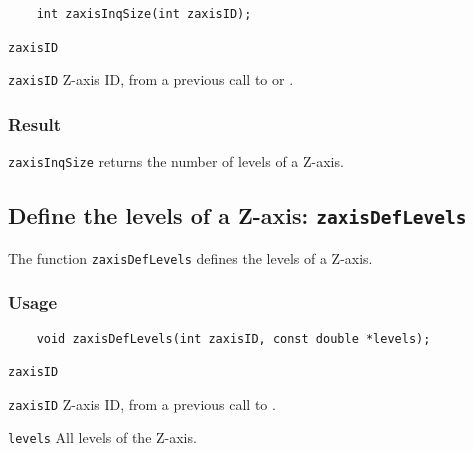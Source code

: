 \begin{verbatim}
    int zaxisInqSize(int zaxisID);
\end{verbatim}

\hspace*{4mm}\begin{minipage}[]{15cm}
\begin{deflist}{\texttt{zaxisID}\ }
\item[\texttt{zaxisID}]
Z-axis ID, from a previous call to {} or {}.

\end{deflist}
\end{minipage}

\subsubsection*{Result}

{\texttt{zaxisInqSize}} returns the number of levels of a Z-axis.



\subsection{Define the levels of a Z-axis: \texttt{zaxisDefLevels}}
\label{zaxisDefLevels}

The function {\texttt{zaxisDefLevels}} defines the levels of a Z-axis.

\subsubsection*{Usage}

\begin{verbatim}
    void zaxisDefLevels(int zaxisID, const double *levels);
\end{verbatim}

\hspace*{4mm}\begin{minipage}[]{15cm}
\begin{deflist}{\texttt{zaxisID}\ }
\item[\texttt{zaxisID}]
Z-axis ID, from a previous call to {}.
\item[\texttt{levels}]
All levels of the Z-axis.

\end{deflist}
\end{minipage}


